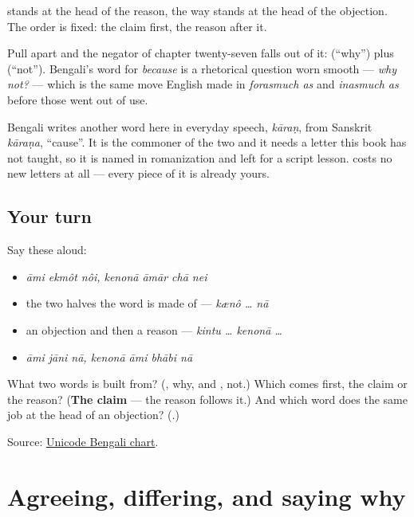 \textbf{} stands at the head of the reason, the way \textbf{} stands at the head of the objection. The order is fixed: the claim first, the reason after it.

\begin{cousinweb}
Pull \textbf{} apart and the negator of chapter twenty-seven falls out of it: \textbf{} (\textquotedblleft{}why\textquotedblright{}) plus \textbf{} (\textquotedblleft{}not\textquotedblright{}). Bengali's word for \emph{because} is a rhetorical question worn smooth — \emph{why not?} — which is the same move English made in \emph{forasmuch as} and \emph{inasmuch as} before those went out of use.

Bengali writes another word here in everyday speech, \emph{kāraṇ}, from Sanskrit \emph{kāraṇa}, \textquotedblleft{}cause\textquotedblright{}. It is the commoner of the two and it needs a letter this book has not taught, so it is named in romanization and left for a script lesson. \textbf{} costs no new letters at all — every piece of it is already yours.
\end{cousinweb}

\subsection*{Your turn}
Say these aloud:

\begin{itemize}
\raggedright
  \item \emph{āmi ekmôt nôi, kenonā āmār chā nei}
  \item the two halves the word is made of — \emph{kænô … nā}
  \item an objection and then a reason — \emph{kintu … kenonā …}
  \item \emph{āmi jāni nā, kenonā āmi bhābi nā}
\end{itemize}

\begin{tcolorbox}[breakable,colback=teal!4,colframe=teal!35!black,title={Before you move on}]
What two words is \textbf{} built from? (\textbf{}, why, and \textbf{}, not.) Which comes first, the claim or the reason? (\textbf{The claim} — the reason follows it.) And which word does the same job at the head of an objection? (\textbf{}.)

Source: \href{https://www.unicode.org/charts/PDF/U0980.pdf}{Unicode Bengali chart}.
\end{tcolorbox}
\section[\texorpdfstring{\bn{কিন্তু} · \bn{একমত} … (kintu · ekmôt …)}{কিন্তু · একমত … (kintu · ekmôt …)}]{Agreeing, differing, and saying why}

